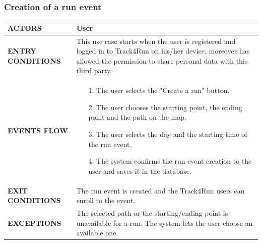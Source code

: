 \documentclass[a4paper]{article}
\begin{document}
\subsubsection{Creation of a run event}
\begin{center}
    \begin{tabular}{l || p{8cm} ||}
        \bf{ACTORS} & User \\ \hline
        \bf{ENTRY CONDITIONS} & This use case starts when the user is registered and logged in to Track4Run on his/her device, moreover has allowed the permission to share personal data with this third party.  \\ \hline
        \bf{EVENTS FLOW} & \begin{itemize}[noitemsep, topsep=0cm, leftmargin=*] \vspace{-0.2cm}
            \item[1.] The user selects the "Create a run" button.
            \item[2.] The user chooses the starting point, the ending point and the path on the map.
            \item[3.] The user selects the day and the starting time of the run event.
            \item[4.] The system confirms the run event creation to the user and saves it in the database.
        \end{itemize}
        \\ \hline
        \bf{EXIT CONDITIONS} & The run event is created and the Track4Run users can enroll to the event.\\ \hline
        \bf{EXCEPTIONS} &  The selected path or the starting/ending point is unavailable for a run. The system lets the user choose an available one. \\ \hline \hline
    \end{tabular}
\end{center}

\vspace{1cm}
\end{document}
